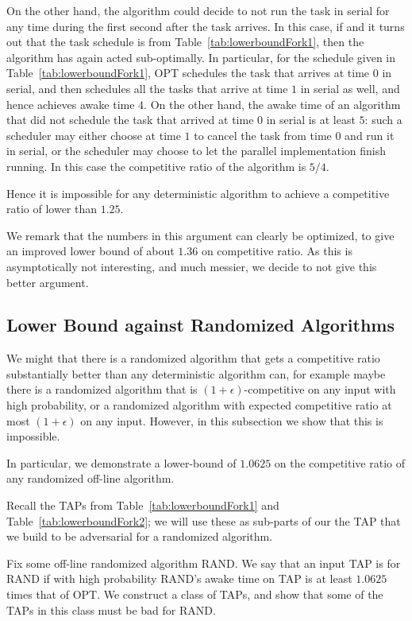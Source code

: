 On the other hand, the algorithm could decide to not run the task
in serial for any time during the first second after the task
arrives. In this case, if
and it turns out that the task schedule is from
Table~\ref{tab:lowerboundFork1}, then the algorithm has again
acted sub-optimally. In particular, for the schedule given in
Table~\ref{tab:lowerboundFork1}, OPT schedules the task that
arrives at time $0$ in serial, and then schedules all the tasks
that arrive at time $1$ in serial as well, and hence achieves
awake time $4$. On the other hand, the awake time of an algorithm
that did not schedule the task that arrived at time $0$ in
serial is at least $5$: such a scheduler may either choose at
time $1$ to cancel the task from time $0$ and run it in serial,
or the scheduler may choose to let the parallel implementation
finish running. In this case the competitive ratio of the
algorithm is $5/4$.

Hence it is impossible for any deterministic algorithm to achieve
a competitive ratio of lower than $1.25$.

We remark that the numbers in this argument can clearly be
optimized, to give an improved lower bound of about $1.36$ on
competitive ratio. As this is asymptotically not interesting, and
much messier, we decide to not give this better argument.

\subsection{Lower Bound against Randomized Algorithms}
We might that there is a randomized algorithm that gets a
competitive ratio substantially better than any deterministic
algorithm can, for example maybe there is a randomized algorithm
that is $(1+\epsilon)$-competitive on any input with high
probability, or a randomized algorithm with expected competitive
ratio at most $(1+\epsilon)$ on any input. However, in this
subsection we show that this is impossible.

In particular, we demonstrate a lower-bound of $1.0625$ on the
competitive ratio of any randomized off-line algorithm.

Recall the TAPs from Table~\ref{tab:lowerboundFork1} and
Table~\ref{tab:lowerboundFork2}; we will use these as sub-parts
of our the TAP that we build to be adversarial for a randomized
algorithm. 

Fix some off-line randomized algorithm RAND. We say that an input
TAP is  for RAND if with high probability RAND's awake
time on TAP is at least $1.0625$ times that of OPT.
We construct a class of TAPs, and show that some of the TAPs in
this class must be bad for RAND.

